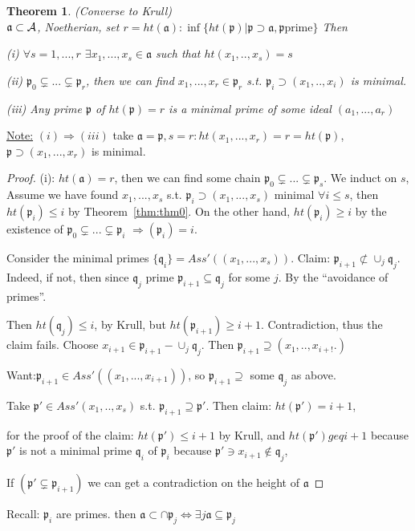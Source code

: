 \documentclass[11pt]{article}
\newtheorem{thm}{Theorem}[section]
\newcommand{\sca}{{\mathfrak a}}
\newcommand{\scp}{{\mathfrak p}}
\newcommand{\scq}{\mathfrak q}
\newcommand{\cala}{{\cal A}}
\newcommand{\Lrta}{\Longrightarrow}
\newcommand{\Llrta}{\Longleftrightarrow}
\begin{document}
\begin{thm}\label{thm:Krull_converse}
(Converse to Krull)\\
$\sca\subset \cala$, Noetherian,  set $r=ht(\sca):\inf\{ht(\scp)|\scp\supset \sca,\scp\text{prime}\}$
Then 

(i) $\forall s=1,...,r$ $\exists x_1,...,x_s\in\sca$ such that $ht(x_1,..,x_s)=s$

(ii) $\scp_0\subsetneq ...\subsetneq \scp_r$, then we can find $x_1,...,x_r\in\scp_r$ s.t. $\scp_i\supset(x_1,..,x_i)$ is minimal.

(iii) Any prime $\scp$ of $ht(\scp)=r$ is a minimal prime of some ideal $(a_1,...,a_r)$
\end{thm}
\underline{Note:} $(i)\Lrta(iii)$ take $\sca=\scp,s=r:ht(x_1,...,x_r)=r=ht(\scp)$, $\scp\supset (x_1,...,x_r)$ is minimal. 

\begin{proof}
(i): $ht(\sca)=r$, then we can find some chain $\scp_0\subsetneq ...\subsetneq\scp_s $. We induct on $s$, Assume we have found $x_1,...,x_s$ s.t.
$\scp_i\supset(x_1,...,x_s)$ minimal $\forall i\leq s$, then $ht(\scp_i)\leq i$ by Theorem~\ref{thm:thm0}. On the other hand, $ht(\scp_i)\geq i$ by the existence of $\scp_0\subsetneq...\subsetneq \scp_i$ $\Lrta(\scp_i)=i$.

Consider the minimal primes $\{\scq_i\}=Ass'((x_1,...,x_s))$. Claim: $\scp_{i+1}\not \subset \cup_j\scq_j$. Indeed, if not, then since $\scq_j$ prime $\scp_{i+1}\subseteq \scq_j$ for some $j$. By the ``avoidance of primes''.

Then $ht(\scq_j)\leq i$, by Krull, but $ht(\scp_{i+1})\geq i+1$. Contradiction, thus the claim fails. Choose $x_{i+1}\in\scp_{i+1}-\cup_j\scq_j$. Then $\scp_{i+1}\supseteq(x_1,..,x_{i+!}.)$

Want:$\scp_{i+1}\in Ass'((x_1,...,x_{i+1}))$, so $\scp_{i+1}\supseteq $ some $\scq_j$ as above.

Take $\scp'\in Ass'(x_1,..,x_s)$ s.t. $\scp_{i+1}\supseteq\scp'.$ Then claim: $ht(\scp')=i+1$,

for the proof of the claim:
$ht(\scp')\leq i+1$ by Krull, and $ht(\scp')geq i+1$ because $\scp'$ is not a minimal prime $\scq_i$ of $\scp_i$ because $\scp'\ni x_{i+1}\notin\scq_j$,

If $(\scp'\subsetneq \scp_{i+1})$ we can get a contradiction on the height of $\sca$
\end{proof}

Recall: $\scp_i$ are primes. then $\sca\subset \cap\scp_j\Llrta \exists j \sca\subseteq \scp_j$
\end{document}
